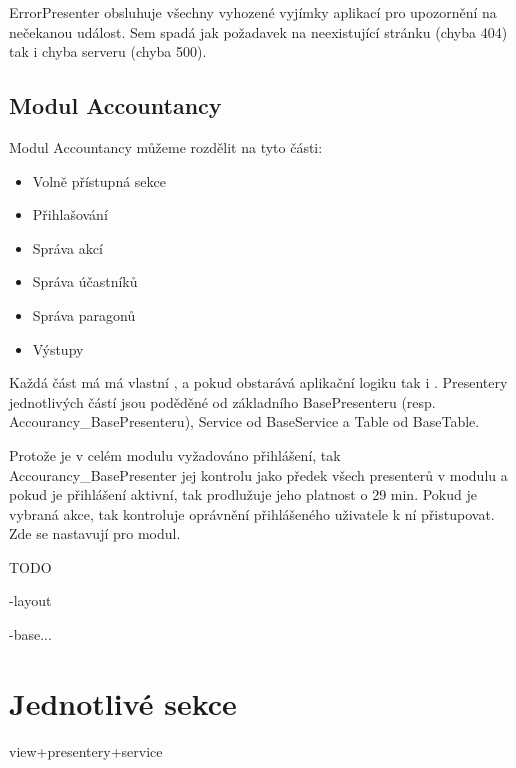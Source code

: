\documentclass[thesis=B,czech]{FITthesis}[2011/06/14]
\begin{document}
ErrorPresenter obsluhuje všechny vyhozené vyjímky aplikací pro upozornění na nečekanou událost. Sem spadá jak požadavek na neexistující stránku (chyba 404) tak i chyba serveru (chyba 500).

\subsection{Modul Accountancy}

Modul Accountancy můžeme rozdělit na tyto části:
\begin{itemize}
	\item Volně přístupná sekce
	\item Přihlašování
	\item Správa akcí
	\item Správa účastníků
	\item Správa paragonů
	\item Výstupy
\end{itemize}

Každá část má má vlastní ,  a pokud obstarává aplikační logiku tak i . Presentery jednotlivých částí jsou poděděné od základního BasePresenteru (resp. Accourancy\_BasePresenteru), Service od BaseService a Table od BaseTable.

Protože je v celém modulu vyžadováno přihlášení, tak Accourancy\_BasePresenter jej kontrolu jako předek všech presenterů v modulu a pokud je přihlášení aktivní, tak prodlužuje jeho platnost o 29 min. Pokud je vybraná akce, tak kontroluje oprávnění přihlášeného uživatele k ní přistupovat. Zde se nastavují  pro modul.

TODO 




-layout

-base...

\section{Jednotlivé sekce}
view+presentery+service
\subsection{}

\subsection{}



\begin{conclusion}
\end{conclusion}
\end{document}
